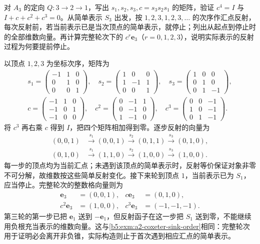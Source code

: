 \begin{optionalexercise}\label{b5:ex:10-a2-coxeter}
	对 \(A_3\) 的定向 \(Q:3\to2\to1\)，写出 \(s_1,s_2,s_3,c=s_3s_2s_1\) 的矩阵，验证 \(c^4=I\) 与 \(I+c+c^2+c^3=0\)。从简单表示 \(S_3\) 出发，按 \(1,2,3,1,2,3,\ldots\) 的次序作汇点反射，每次反射前，若当前表示已是当次顶点的简单表示，就停止；列出从起点到停止时的全部维数向量。再计算完整轮次下的 \(c^r\mathbf e_3\)（\(r=0,1,2,3\)），说明实际表示的反射过程为何要提前停止。
\end{optionalexercise}
\begin{solution}
	以顶点 \(1,2,3\) 为坐标次序，矩阵为
	\[
		\begin{gathered}
			s_1=\begin{pmatrix}-1&1&0\\0&1&0\\0&0&1\end{pmatrix},\quad
			s_2=\begin{pmatrix}1&0&0\\1&-1&1\\0&0&1\end{pmatrix},\quad
			s_3=\begin{pmatrix}1&0&0\\0&1&0\\0&1&-1\end{pmatrix},\\
			c=\begin{pmatrix}-1&1&0\\-1&0&1\\-1&0&0\end{pmatrix},\quad
			c^2=\begin{pmatrix}0&-1&1\\0&-1&0\\1&-1&0\end{pmatrix},\quad
			c^3=\begin{pmatrix}0&0&-1\\1&0&-1\\0&1&-1\end{pmatrix}.
		\end{gathered}
	\]
	将 \(c^3\) 再右乘 \(c\) 得到 \(I\)，把四个矩阵相加得到零。逐步反射的向量为
	\[
		\begin{aligned}
			(0,0,1)&\xrightarrow{s_1}(0,0,1) \xrightarrow{s_2}(0,1,1) \xrightarrow{s_3}(0,1,0),\\
			(0,1,0)&\xrightarrow{s_1}(1,1,0) \xrightarrow{s_2}(1,0,0) \xrightarrow{s_3}(1,0,0).
		\end{aligned}
	\]
	每一步的顶点均为当前汇点；未遇到该顶点的简单表示时，反射等价保证对象非零不可分解，故维数按这些简单反射变化。接下来轮到顶点 \(1\)，当前表示已为 \(S_1\)，应当停止。完整轮次的整数格向量则为
	\[
		\begin{aligned}
			\mathbf e_3&=(0,0,1),& c\mathbf e_3&=(0,1,0),\\
			c^2\mathbf e_3&=(1,0,0),& c^3\mathbf e_3&=(-1,-1,-1).
		\end{aligned}
	\]
	第三轮的第一步已把 \(\mathbf e_1\) 送到 \(-\mathbf e_1\)，但反射函子在这一步把 \(S_1\) 送到零，不能继续用负根充当表示的维数向量。这与\cref{b5:exm:a2-coxeter-sink-order}相同：完整轮次用于证明必会离开非负锥，实际构造则止于首次遇到相应汇点的简单表示。
\end{solution}

